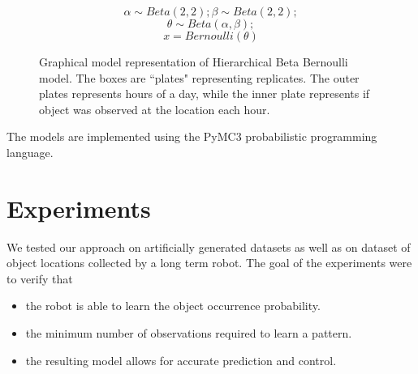 \noindent
\begin{figure}[htp]

\begin{minipage}{0.3\textwidth}
\centering


\end{minipage}%
\begin{minipage}{0.7\textwidth}

\begin{equation*}
	\alpha \sim Beta(2,2) ; \beta \sim Beta(2, 2);
\end{equation*}
\begin{equation*}
	\theta \sim Beta(\alpha, \beta);
\end{equation*}
\begin{equation*}
	x = Bernoulli(\theta)
\end{equation*}
\end{minipage}
\caption[Hierarchical Beta Bernoulli graphical model]{Graphical model representation of Hierarchical Beta Bernoulli model. The boxes are ``plates" representing replicates. The outer plates represents hours of a day, while the inner plate represents if object was observed at the location each hour.}
\label{bbm}
\end{figure}

The models are implemented using the PyMC3 probabilistic programming language.

\FloatBarrier
\section{Experiments}

We tested our approach on artificially generated datasets as well as on dataset of object locations collected by a long term robot.
The goal of the experiments were to verify that
\begin{itemize}
    \item the robot is able to learn the object occurrence probability.
	\item the minimum number of observations required to learn a pattern.
	\item the resulting model allows for accurate prediction and control.
\end{itemize}

